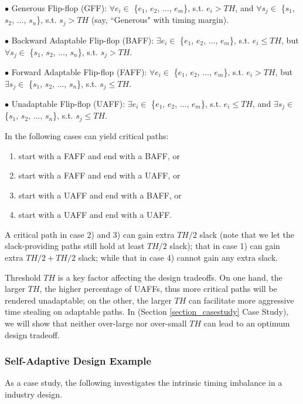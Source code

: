$\bullet$ Generous Flip-flop (GFF):  $\forall e_i\in$ \{$e_1$, $e_2$, $\ldots$,
$e_m$\}, s.t. $e_i>TH$, and $\forall s_j\in$ \{$s_1$, $s_2$, $\ldots$, $s_n$\}, s.t. $s_j>TH$ (say, ``Generous" with timing margin).

$\bullet$ Backward Adaptable Flip-flop (BAFF):  $\exists e_i\in$ \{$e_1$, $e_2$, $\ldots$,
$e_m$\}, s.t. $e_i\leq TH$, but $\forall s_j\in$ \{$s_1$, $s_2$, $\ldots$, $s_n$\}, s.t. $s_j>TH$.

$\bullet$ Forward Adaptable Flip-flop (FAFF):  $\forall e_i \in$ \{$e_1$, $e_2$, $\ldots$,
$e_m$\}, s.t. $e_i>TH$, but $\exists s_j\in$ \{$s_1$, $s_2$, $\ldots$, $s_n$\}, s.t. $s_j\leq TH$.


$\bullet$ Unadaptable Flip-flop (UAFF):  $\exists e_i\in$ \{$e_1$, $e_2$, $\ldots$,
$e_m$\}, s.t. $e_i\leq TH$, and $\exists s_j\in$ \{$s_1$, $s_2$, $\ldots$, $s_n$\}, s.t. $s_j\leq TH$.


In the following cases can yield critical paths:
\begin{enumerate}
\item  start with a FAFF and end with a BAFF, or
\item  start with a FAFF and end with a UAFF, or
\item  start with a UAFF and end with a BAFF, or
\item  start with a UAFF and end with a UAFF.
\end{enumerate}

A critical path in case 2) and 3) can gain extra $TH/2$ slack (note that we let the slack-providing paths still hold at least $TH/2$ slack); that in case 1) can gain extra $TH/2+TH/2$ slack; while that in case 4) cannot gain any extra slack.


Threshold $TH$ is a key factor affecting the design tradeoffs. On one hand, the larger $TH$, the higher percentage of UAFFs, thus more critical paths will be rendered unadaptable; on the other, the larger $TH$ can facilitate more aggressive time stealing on adaptable paths. In (Section \ref{section_casestudy} Case Study), we will show that neither over-large nor over-small $TH$ can lead to an optimum design tradeoff.

\subsubsection{Self-Adaptive Design Example}\label{sec:investigation}
As a case study, the following investigates the intrinsic timing imbalance in a industry design.

